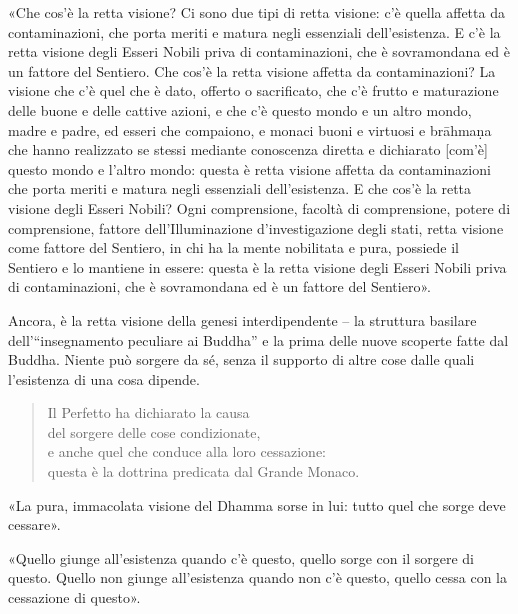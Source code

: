 «Che cos’è la retta visione? Ci sono due tipi di retta visione: c’è quella
affetta da contaminazioni, che porta meriti e matura negli essenziali
dell’esistenza. E c’è la retta visione degli Esseri Nobili priva di
contaminazioni, che è sovramondana ed è un fattore del Sentiero. Che cos’è la
retta visione affetta da contaminazioni? La visione che c’è quel che è dato,
offerto o sacrificato, che c’è frutto e maturazione delle buone e delle cattive
azioni, e che c’è questo mondo e un altro mondo, madre e padre, ed esseri che
compaiono, e monaci buoni e virtuosi e brāhmaṇa che hanno realizzato se stessi
mediante conoscenza diretta e dichiarato [com’è] questo mondo e l’altro mondo:
questa è retta visione affetta da contaminazioni che porta meriti e matura negli
essenziali dell’esistenza. E che cos’è la retta visione degli Esseri Nobili?
Ogni comprensione, facoltà di comprensione, potere di comprensione, fattore
dell’Illuminazione d’investigazione degli stati, retta visione come fattore del
Sentiero, in chi ha la mente nobilitata e pura, possiede il Sentiero e lo
mantiene in essere: questa è la retta visione degli Esseri Nobili priva di
contaminazioni, che è sovramondana ed è un fattore del Sentiero».


 Ancora, è la retta visione della genesi
interdipendente – la struttura basilare dell’“insegnamento peculiare ai Buddha”
e la prima delle nuove scoperte fatte dal Buddha. Niente può sorgere da sé,
senza il supporto di altre cose dalle quali l’esistenza di una cosa dipende.


\begin{quote}
Il Perfetto ha dichiarato la causa \\
del sorgere delle cose condizionate, \\
e anche quel che conduce alla loro cessazione: \\
questa è la dottrina predicata dal Grande Monaco.
\end{quote}

«La pura, immacolata visione del Dhamma sorse in lui: tutto quel che sorge deve
cessare».


 «Quello giunge all’esistenza quando c’è questo, quello sorge
con il sorgere di questo. Quello non giunge all’esistenza quando non c’è questo,
quello cessa con la cessazione di questo».

